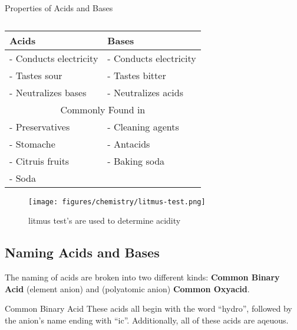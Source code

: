 \documentclass[12pt]{report}
\begin{document}
\begin{table}[h!] %

    \renewcommand{\arraystretch}{1.5} %
    \setlength{\tabcolsep}{10pt} %
    \setlength{\arrayrulewidth}{0.25mm}

    \vspace{0.5em}
    \begin{center}
        Properties of Acids and Bases \\
        \vspace{0.5em}
        \begin{tabular}{|l|l|} %
        \hline
        Acids & Bases \\ %
        \hline
        - Conducts electricity & - Conducts electricity \\ %
        - Tastes sour & - Tastes bitter\\ 
        - Neutralizes bases & - Neutralizes acids\\ 
        \hline
        \multicolumn{2}{|c|}{Commonly Found in}\\  
        \hline
        - Preservatives & - Cleaning agents\\
        - Stomache & - Antacids\\ 
        - Citruis fruits & - Baking soda\\ 
        - Soda & \\ 
        \hline
        \end{tabular}
    \end{center}
    \caption{}
\end{table}

\begin{figure}[H]
\centering
    \texttt{[image: figures/chemistry/litmus-test.png]}
    \caption{litmus test's are used to determine acidity}
\end{figure}

\subsection{Naming Acids and Bases}
The naming of acids are broken into two different kinds: \textbf{Common Binary Acid} (element anion) and (polyatomic anion) \textbf{Common Oxyacid}.
\begin{note}{Common Binary Acid}
    These acids all begin with the word ``hydro'', followed by the anion's name ending with ``ic''. Additionally, all of these acids are aqeuous.
\end{note}
\end{document}
